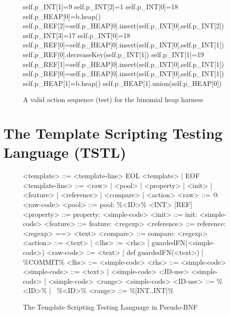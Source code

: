 \documentclass[runningheads,a4paper]{llncs}
\begin{document}
\begin{figure}[t]
{\scriptsize
\begin{code}
self.p\_INT[1]=9
self.p\_INT[2]=1
self.p\_INT[0]=18
self.p\_HEAP[0]=b.heap()
self.p\_REF[2]=self.p\_HEAP[0].insert(self.p\_INT[0],self.p\_INT[2])
self.p\_INT[3]=17
self.p\_INT[0]=18
self.p\_REF[0]=self.p\_HEAP[0].insert(self.p\_INT[0],self.p\_INT[1])
self.p\_REF[0].decreaseKey(self.p\_INT[1])
self.p\_INT[1]=19
self.p\_REF[1]=self.p\_HEAP[0].insert(self.p\_INT[0],self.p\_INT[1])
self.p\_REF[0]=self.p\_HEAP[0].insert(self.p\_INT[0],self.p\_INT[1])
self.p\_HEAP[1]=b.heap()
self.p\_HEAP[1].union(self.p\_HEAP[0])
\end{code}
}
\caption{A valid action sequence (test) for the binomial heap harness}
\label{fig:validbinheaptest}
\end{figure}


\section{The Template Scripting Testing Language (TSTL)}

\begin{figure}[t]
{\scriptsize
\begin{code}
<template> ::= <template-line> EOL <template> | EOF
<template-line> ::= <raw> | <pool> | <property> | <init> | 
                    <feature> | <reference> | <compare> | <action>
<raw> ::= @ <raw-code>
<pool> ::= pool: \%<ID>\% <INT> [REF]
<property> ::= property: <simple-code>
<init> ::= init: <simple-code>
<feature> ::= feature: <regexp>
<reference> ::= reference: <regexp> ==> <text>
<compare> ::= compare: <regexp>
<action> ::= <text> | <lhs> := <rhs> | guardedFN(<simple-code>)
<raw-code> ::= <text> | def guardedFN(<text>) | \%COMMIT\%
<lhs> ::= <simple-code>
<rhs> ::= <simple-code>
<simple-code> ::= <text> | <simple-code> <ID-use> <simple-code> |
                  <simple-code> <range> <simple-code>
<ID-use> ::= \%<ID>\% | ~\%<ID>\%
<range> ::= \%[INT..INT]\%
\end{code}
}
\caption{The Template Scripting Testing Language in Pseudo-BNF}
\label{fig:corelang}
\end{figure}
\end{document}
